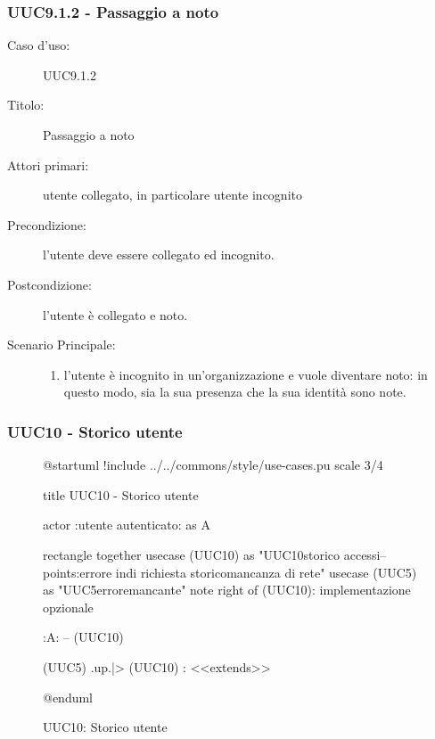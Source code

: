 \documentclass[casi-duso]{subfiles}
\begin{document}
\subsubsection{UUC9.1.2 - Passaggio a noto}%
\label{subsub:UUC9.1.2utente}
\begin{description}
  \item[Caso d’uso:] UUC9.1.2
  \item[Titolo:] Passaggio a noto
  \item[Attori primari:] utente collegato, in particolare utente incognito
  \item[Precondizione:] l'utente deve essere collegato ed incognito.
  \item[Postcondizione:] l'utente è collegato e noto.
  \item[Scenario Principale:]
        \begin{enumerate}
          \item l'utente è incognito in un'organizzazione e vuole diventare noto: in questo modo, sia la sua presenza che la sua identità sono note.
        \end{enumerate}
\end{description}

\subsubsection{UUC10 - Storico utente}%
\label{subsub:UUC10utente}

\begin{figure}[h!] 
  \centering 
  \begin{plantuml}
  @startuml
  !include ../../commons/style/use-cases.pu
  scale 3/4

  title UUC10 - Storico utente

  actor :utente autenticato: as A

  rectangle {
    together {
      usecase (UUC10) as "UUC10\nVisualizzazione storico accessi\n--\nExtension points:\nVisualizzazione errore in\ncaso di richiesta storico\nin mancanza di rete"
      usecase (UUC5) as "UUC5\nVisualizzazione errore\nrete mancante"
      note right of (UUC10): implementazione opzionale
    }
  }

  :A: -- (UUC10)

  (UUC5) .up.|> (UUC10) : <<extends>>

  @enduml
  \end{plantuml} 
  \caption{UUC10: Storico utente} 
  \label{fig:uuc10} 
\end{figure}
\end{document}

